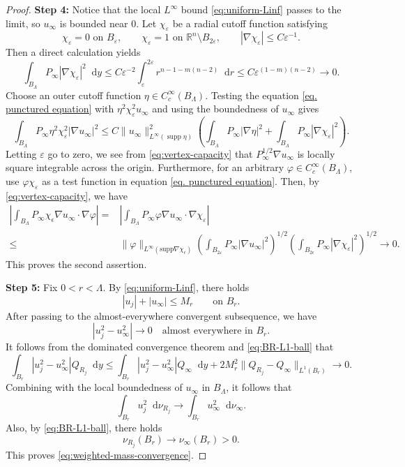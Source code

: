 \documentclass[10pt,a4paper]{amsart}
\numberwithin{equation}{section}
\newcommand{\dd}{\mathop{}\!\mathrm{d}}%
\begin{document}
\begin{proof}
{\bf Step 4:}
Notice that the local $L^\infty$ bound \cref{eq:uniform-Linf} passes to the limit, so $u_\infty$ is bounded
near $0$. 
 Let $\chi_\varepsilon$ be a radial cutoff function satisfying
\[
    \chi_\varepsilon=0\text{ on }B_\varepsilon,
    \qquad
    \chi_\varepsilon=1\text{ on }\mathbb R^n\setminus B_{2\varepsilon},
    \qquad
    |\nabla\chi_\varepsilon|\leq C\varepsilon^{-1}.
\]
Then a direct calculation yields
\begin{equation}\label{eq:vertex-capacity}
    \int_{B_\Lambda} P_\infty|\nabla\chi_\varepsilon|^2\dd y
    \leq
    C\varepsilon^{-2}
    \int_\varepsilon^{2\varepsilon}
    r^{n-1-m(n-2)}\dd r
    \leq C\varepsilon^{(1-m)(n-2)}
    \to 0.
\end{equation}
Choose an outer cutoff function $\eta\in C_c^\infty(B_\Lambda)$.
Testing the equation \cref{eq. punctured equation} with
$\eta^2\chi_\varepsilon^2u_\infty$ and using the boundedness of
$u_\infty$ gives
\[
    \int_{B_\Lambda} P_\infty\eta^2\chi_\varepsilon^2
    |\nabla u_\infty|^2
    \leq
    C\|u_\infty\|_{L^\infty(\operatorname{supp}\eta)}^2
    \left(
    \int_{B_\Lambda} P_\infty|\nabla\eta|^2
    +\int_{B_\Lambda} P_\infty|\nabla\chi_\varepsilon|^2
    \right).
\]
Letting $\varepsilon$ go to zero, we see from \cref{eq:vertex-capacity} that
$P_\infty^{1/2}\nabla u_\infty$ is locally square integrable across the
origin. Furthermore,  for an arbitrary
$\varphi\in C_c^\infty(B_\Lambda)$, use
$\varphi\chi_\varepsilon$ as a test function in  equation \cref{eq. punctured equation}.
Then, by \cref{eq:vertex-capacity}, we have
\begin{align*}
    \left|
    \int_{B_\Lambda}P_{\infty}\chi_\epsilon
    \nabla u_{\infty}\cdot\nabla \varphi
    \right|
    =&\left|
    \int_{B_\Lambda} P_\infty\varphi
    \nabla u_\infty\cdot\nabla\chi_\varepsilon
    \right|\\
    \leq &
\|\varphi\|_{L^\infty (\text{supp}\nabla \chi_\epsilon)}
\left(
\int_{B_{2\varepsilon}}P_\infty|\nabla u_\infty|^2
\right)^{1/2}
\left(
\int_{B_{2\epsilon}} P_\infty|\nabla\chi_\varepsilon|^2
\right)^{1/2}\to0.
\end{align*}
This proves the second assertion.

{\bf Step 5:}
Fix $0<r<\Lambda$.  By \cref{eq:uniform-Linf}, there holds
\[
    |u_j|+|u_\infty|\leq M_r
    \qquad\text{on }B_r.
\]
After passing to the almost-everywhere convergent subsequence, we have
\[
    |u_j^2-u_\infty^2|\to0
    \quad\text{almost everywhere in }B_r.
\]
It follows from the dominated convergence theorem and \cref{eq:BR-L1-ball} that
\begin{equation}
\int_{B_r}|u_j^2-u_\infty^2|Q_{R_j}\dd y
\leq
\int_{B_r}|u_j^2-u_\infty^2|Q_\infty\dd y
+2M_r^2
\|Q_{R_j}-Q_\infty\|_{L^1(B_r)}
\to0.
\label{eq:weighted-square-convergence}
\end{equation}
 Combining with the local boundedness of $u_\infty$ in $B_\Lambda$, it follows that
\[
    \int_{B_r}u_j^2\dd \nu_{R_j}
    \to
    \int_{B_r}u_\infty^2\dd \nu_\infty.
\]
Also, by \cref{eq:BR-L1-ball}, there holds
\[
    \nu_{R_j}(B_r)\to\nu_\infty(B_r)>0.
\]
This proves \cref{eq:weighted-mass-convergence}.


\end{proof}
\end{document}
